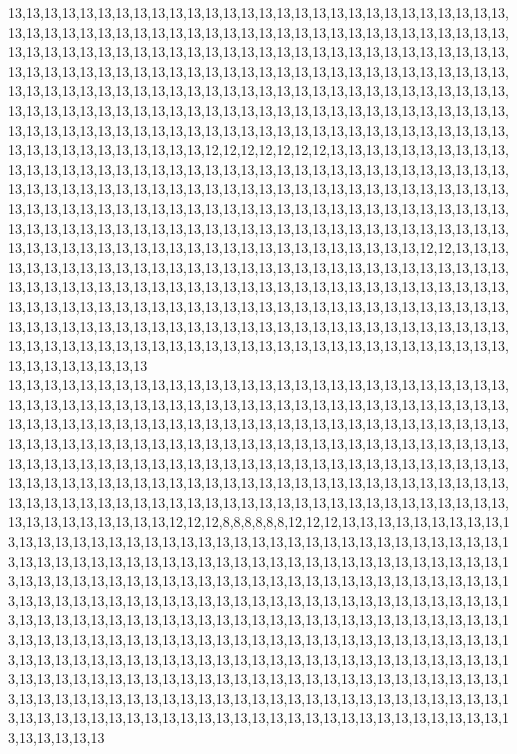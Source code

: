 13,13,13,13,13,13,13,13,13,13,13,13,13,13,13,13,13,13,13,13,13,13,13,13,13,13,13,13,13,13,13,13,13,13,13,13,13,13,13,13,13,13,13,13,13,13,13,13,13,13,13,13,13,13,13,13,13,13,13,13,13,13,13,13,13,13,13,13,13,13,13,13,13,13,13,13,13,13,13,13,13,13,13,13,13,13,13,13,13,13,13,13,13,13,13,13,13,13,13,13,13,13,13,13,13,13,13,13,13,13,13,13,13,13,13,13,13,13,13,13,13,13,13,13,13,13,13,13,13,13,13,13,13,13,13,13,13,13,13,13,13,13,13,13,13,13,13,13,13,13,13,13,13,13,13,13,13,13,13,13,13,13,13,13,13,13,13,13,13,13,13,13,13,13,13,13,13,13,13,13,13,13,13,13,13,13,13,13,13,13,13,13,13,13,13,13,13,13,13,13,13,13,13,13,13,13,13,12,12,12,12,12,12,12,13,13,13,13,13,13,13,13,13,13,13,13,13,13,13,13,13,13,13,13,13,13,13,13,13,13,13,13,13,13,13,13,13,13,13,13,13,13,13,13,13,13,13,13,13,13,13,13,13,13,13,13,13,13,13,13,13,13,13,13,13,13,13,13,13,13,13,13,13,13,13,13,13,13,13,13,13,13,13,13,13,13,13,13,13,13,13,13,13,13,13,13,13,13,13,13,13,13,13,13,13,13,13,13,13,13,13,13,13,13,13,13,13,13,13,13,13,13,13,13,13,13,13,13,13,13,13,13,13,13,13,13,13,13,13,13,13,13,13,13,13,13,13,13,13,12,12,13,13,13,13,13,13,13,13,13,13,13,13,13,13,13,13,13,13,13,13,13,13,13,13,13,13,13,13,13,13,13,13,13,13,13,13,13,13,13,13,13,13,13,13,13,13,13,13,13,13,13,13,13,13,13,13,13,13,13,13,13,13,13,13,13,13,13,13,13,13,13,13,13,13,13,13,13,13,13,13,13,13,13,13,13,13,13,13,13,13,13,13,13,13,13,13,13,13,13,13,13,13,13,13,13,13,13,13,13,13,13,13,13,13,13,13,13,13,13,13,13,13,13,13,13,13,13,13,13,13,13,13,13,13,13,13,13,13,13,13,13,13,13,13,13,13,13,13,13,13,13
13,13,13,13,13,13,13,13,13,13,13,13,13,13,13,13,13,13,13,13,13,13,13,13,13,13,13,13,13,13,13,13,13,13,13,13,13,13,13,13,13,13,13,13,13,13,13,13,13,13,13,13,13,13,13,13,13,13,13,13,13,13,13,13,13,13,13,13,13,13,13,13,13,13,13,13,13,13,13,13,13,13,13,13,13,13,13,13,13,13,13,13,13,13,13,13,13,13,13,13,13,13,13,13,13,13,13,13,13,13,13,13,13,13,13,13,13,13,13,13,13,13,13,13,13,13,13,13,13,13,13,13,13,13,13,13,13,13,13,13,13,13,13,13,13,13,13,13,13,13,13,13,13,13,13,13,13,13,13,13,13,13,13,13,13,13,13,13,13,13,13,13,13,13,13,13,13,13,13,13,13,13,13,13,13,13,13,13,13,13,13,13,13,13,13,13,13,13,13,13,13,13,13,13,13,12,12,12,8,8,8,8,8,8,12,12,12,13,13,13,13,13,13,13,13,13,13,13,13,13,13,13,13,13,13,13,13,13,13,13,13,13,13,13,13,13,13,13,13,13,13,13,13,13,13,13,13,13,13,13,13,13,13,13,13,13,13,13,13,13,13,13,13,13,13,13,13,13,13,13,13,13,13,13,13,13,13,13,13,13,13,13,13,13,13,13,13,13,13,13,13,13,13,13,13,13,13,13,13,13,13,13,13,13,13,13,13,13,13,13,13,13,13,13,13,13,13,13,13,13,13,13,13,13,13,13,13,13,13,13,13,13,13,13,13,13,13,13,13,13,13,13,13,13,13,13,13,13,13,13,13,13,13,13,13,13,13,13,13,13,13,13,13,13,13,13,13,13,13,13,13,13,13,13,13,13,13,13,13,13,13,13,13,13,13,13,13,13,13,13,13,13,13,13,13,13,13,13,13,13,13,13,13,13,13,13,13,13,13,13,13,13,13,13,13,13,13,13,13,13,13,13,13,13,13,13,13,13,13,13,13,13,13,13,13,13,13,13,13,13,13,13,13,13,13,13,13,13,13,13,13,13,13,13,13,13,13,13,13,13,13,13,13,13,13,13,13,13,13,13,13,13,13,13,13,13,13,13,13,13,13,13,13,13,13,13,13,13,13,13,13,13,13,13,13,13,13,13,13,13,13,13
